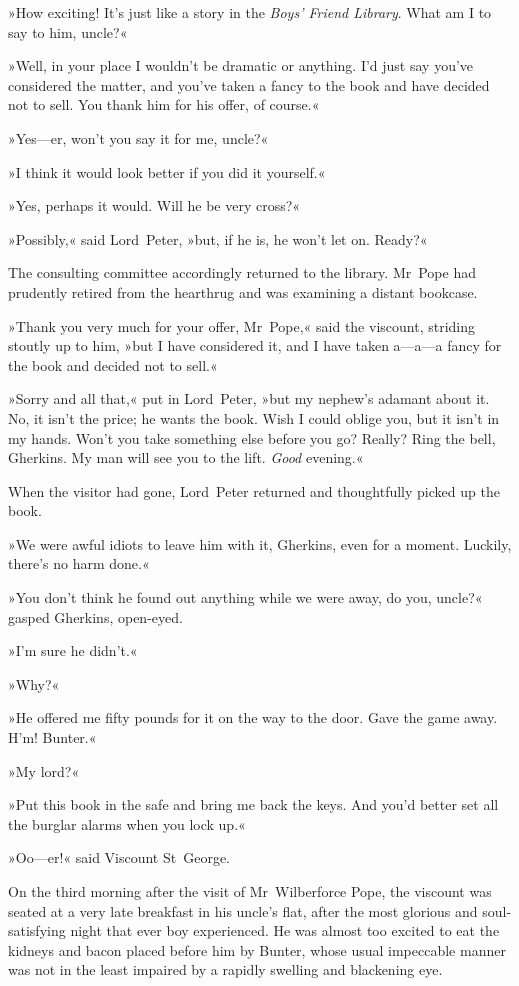 »How exciting! It's just like a story in the \textit{Boys' Friend Library}. What am I to say to him, uncle?«

»Well, in your place I wouldn't be dramatic or anything. I'd just say you've considered the matter, and you've taken a fancy to the book and have decided not to sell. You thank him for his offer, of course.«

»Yes—er, won't you say it for me, uncle?«

»I think it would look better if you did it yourself.«

»Yes, perhaps it would. Will he be very cross?«

»Possibly,« said Lord~Peter, »but, if he is, he won't let on. Ready?«

The consulting committee accordingly returned to the library. Mr~Pope had prudently retired from the hearthrug and was examining a distant bookcase.

»Thank you very much for your offer, Mr~Pope,« said the viscount, striding stoutly up to him, »but I have considered it, and I have taken a—a—a fancy for the book and decided not to sell.«

»Sorry and all that,« put in Lord~Peter, »but my nephew's adamant about it. No, it isn't the price; he wants the book. Wish I could oblige you, but it isn't in my hands. Won't you take something else before you go? Really? Ring the bell, Gherkins. My man will see you to the lift. \textit{Good} evening.«

When the visitor had gone, Lord~Peter returned and thoughtfully picked up the book.

»We were awful idiots to leave him with it, Gherkins, even for a moment. Luckily, there's no harm done.«

»You don't think he found out anything while we were away, do you, uncle?« gasped Gherkins, open-eyed.

»I'm sure he didn't.«

»Why?«

»He offered me fifty pounds for it on the way to the door. Gave the game away. H'm! Bunter.«

»My lord?«

»Put this book in the safe and bring me back the keys. And you'd better set all the burglar alarms when you lock up.«

»Oo—er!« said Viscount St~George.

\divider
On the third morning after the visit of Mr~Wilberforce Pope, the viscount was seated at a very late breakfast in his uncle's flat, after the most glorious and soul-satisfying night that ever boy experienced. He was almost too excited to eat the kidneys and bacon placed before him by Bunter, whose usual impeccable manner was not in the least impaired by a rapidly swelling and blackening eye.

